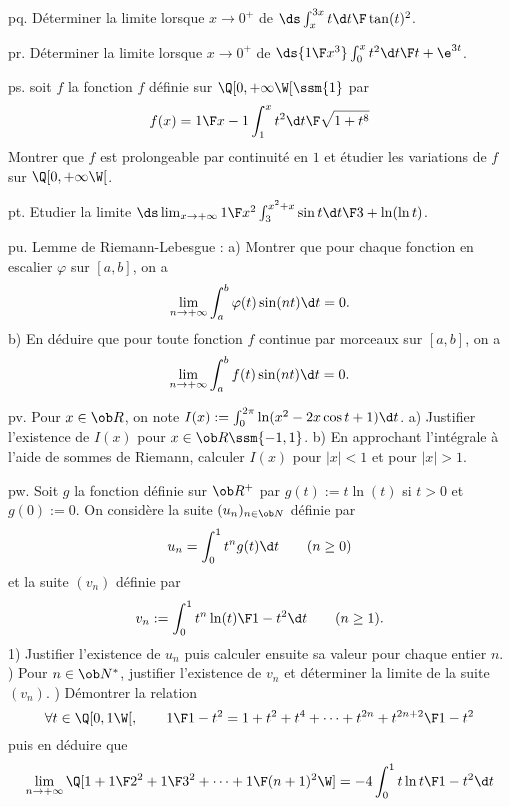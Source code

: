 \exo [Level=1,Fight=2,Learn=2,Field=\FonctionsDéfiniesParUneIntégrale,Type=\Exercices,Origin=] pq. 
Déterminer la limite lorsque $x\to0^+$ de $\ds\int_x^{3x}{t\d t\F \tan(t)^2}$. 

\exo [Level=1,Fight=2,Learn=2,Field=\FonctionsDéfiniesParUneIntégrale,Type=\Exercices,Origin=] pr. 
Déterminer la limite lorsque $x\to0^+$ de $\ds {1\F x^3}\int_0^x{t^2\d t\F t+\e^{3t}}$. 

\exo [Level=1,Fight=2,Learn=2,Field=\FonctionsDéfiniesParUneIntégrale,Type=\Exercices,Origin=] ps. 
soit $f$ la fonction $f$ définie sur $\Q[0,+\infty\W[\ssm\{1\}$ par 
$$
f(x)={1\F x-1}\int_1^x{t^2\d t\F\sqrt{1+t^8}}
$$
Montrer que $f$ est prolongeable par continuité en $1$ et étudier les variations de $f$ sur $\Q[0,+\infty\W[$. 

\exo [Level=1,Fight=2,Learn=2,Field=\Intégration,Type=\Exercices,Origin=,Indication={On pourras scinder l'intégrale en deux et utiliser la formule de la moyenne.}] pt. 
Etudier la limite $\ds\lim_{x\to+\infty}{1\F x^2}\int_3^{x^2+x}{\sin t\d t\F 3+\ln(\ln t)}$. \pn



\exo [Level=1,Fight=2,Learn=2,Field=\Intégration,Type=\Exercices,Origin=] pu. 
Lemme de Riemann-Lebesgue : \pn
a) Montrer que pour chaque fonction en escalier $\varphi$ sur $[a,b]$, on a 
$$
\lim_{n\to+\infty}\int_a^b\varphi(t)\sin(nt)\d t=0.
$$
b) En déduire que pour toute fonction $f$ continue par morceaux sur $[a,b]$, on a 
$$
\lim_{n\to+\infty}\int_a^bf(t)\sin(nt)\d t=0.
$$

\exo [Level=1,Fight=2,Learn=2,Field=\FonctionsDéfiniesParUneIntégrale,Type=\Exercices,Origin=] pv. 
Pour $x\in\ob R$, on note $I(x):=\int_0^{2\pi}\ln(x^2-2x\cos t+1)\d t$. \pn
a) Justifier l'existence de $I(x)$ pour $x\in\ob R\ssm\{-1,1\}$. \pn
b) En approchant l'intégrale à l'aide de sommes de Riemann, calculer $I(x)$ pour $|x|<1$ et pour $|x|>1$.  

\exo [Level=1,Fight=2,Learn=2,Field=\FonctionsDéfiniesParUneIntégrale,Type=\Exercices,Origin=,Indication={2) On pourra introduire la fonction $\ds t\mapsto {t\ln t\F 1-t^2}$.}] pw. 
Soit $g$ la fonction définie sur $\ob R^+$ par $g(t):=t\ln(t)$ si $t>0$ et $g(0):=0$. On considère la suite $(u_n)_{n\in\ob N}$ définie par 
$$
u_n=\int_0^1t^ng(t)\d t\qquad(n\ge0)
$$
et la suite $(v_n)$ définie par 
$$
v_n:=\int_0^1{t^n\ln(t)\F1-t^2}\d t\qquad(n\ge1).
$$
1) Justifier l'existence de $u_n$ puis calculer ensuite sa valeur pour chaque entier $n$. ) Pour $n\in\ob N^*$, justifier l'existence de $v_n$ et déterminer la limite de la suite $(v_n)$. ) Démontrer la relation 
$$
\forall t\in\Q[0,1\W[,\qquad {1\F1-t^2}=1+t^2+t^4+\cdots+t^{2n}+{t^{2n+2}\F 1-t^2}
$$
puis en déduire que 
$$
\lim_{n\to+\infty}\Q[1+{1\F 2^2}+{1\F 3^2}+\cdots+{1\F (n+1)^2}\W]=-4\int_0^1{t\ln t\F 1-t^2}\d t
$$

